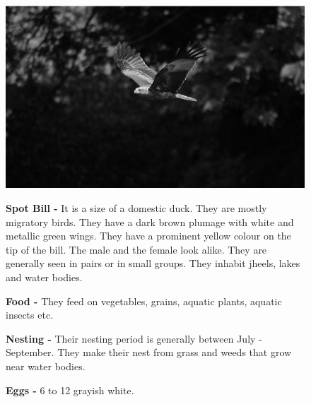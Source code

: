 \begin{figure}[H]
\begin{center}
\includegraphics{figure/Land_birds/01_pariah_kite/pariah-kite.eps}
\end{center}
\medskip
\noindent
{\bf Spot Bill -} It is a size of a domestic duck. They are mostly migratory birds. They have a dark brown plumage with white and metallic green wings. They have a prominent yellow colour on the tip of the bill. The male and the female look alike. They are generally seen in pairs or in small groups. They inhabit jheels, lakes and water bodies.

\medskip
{\bf Food -} They feed on vegetables, grains, aquatic plants, aquatic insects etc.

{\bf Nesting -} Their nesting period is generally between July - September. They make their nest from grass and weeds that grow near water bodies. 

{\bf Eggs -} 6 to 12 grayish white.
\end{figure}

\vfill\eject

~\phantom{a}
\vfill


